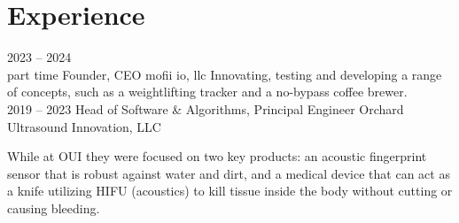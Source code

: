 \documentclass[8pt]{mofiicv}
\begin{document}
	\begin{minipage}[T]{\SecondColumnWidth} 
	\section{Experience}
	\begin{entrylist}
		\entry
			{2023 -- 2024\\\footnotesize{part time}}
			{Founder, CEO}
			{mofii io, llc}
			{
			Innovating, testing and developing a range of concepts, such as a weightlifting tracker and a no-bypass coffee brewer.\\ 
			}
		\entry
			{2019 -- 2023}
			{Head of Software \& Algorithms, Principal Engineer}
			{Orchard Ultrasound Innovation, LLC}
			{
			While at OUI they were focused on two key products: an acoustic fingerprint sensor that is robust against water and dirt, and a medical device that can act as a knife utilizing HIFU (acoustics) to kill tissue inside the body without cutting or causing bleeding.
			
}
\end{entrylist}
\end{minipage}
\end{document}
